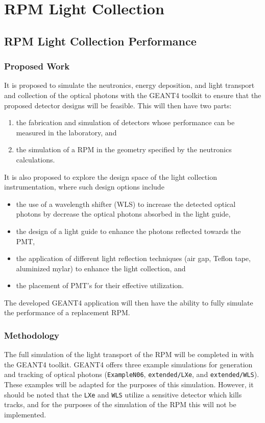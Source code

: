 

\chapter{RPM Light Collection}
\label{chap:LightTransport}
\section{RPM Light Collection Performance}
\label{sec:RPMLCP}



\subsection{Proposed Work}
It is proposed to simulate the neutronics, energy deposition, and light transport and collection of the optical photons with the GEANT4 toolkit to ensure that the proposed detector designs will be feasible. 
This will then have two parts:
\begin{enumerate}
  \item the fabrication and simulation of detectors whose performance can be measured in the laboratory, and
  \item the simulation of a RPM in the geometry specified by the neutronics calculations.
\end{enumerate}
It is also proposed to explore the design space of the light collection instrumentation, where such design options include
\begin{itemize}
  \item the use of a wavelength shifter (WLS) to increase the detected optical photons by decrease the optical photons absorbed in the light guide,
  \item the design of a light guide to enhance the photons reflected towards the PMT,
  \item the application of different light reflection techniques (air gap, Teflon tape, aluminized mylar) to enhance the light collection, and
  \item the placement of PMT's for their effective utilization.
\end{itemize}
The developed GEANT4 application will then have the ability to fully simulate the performance of a replacement RPM.

\subsection{Methodology}
The full simulation of the light transport of the RPM will be completed in with the GEANT4 toolkit.
GEANT4 offers three example simulations for generation and tracking of optical photons (\verb+ExampleN06+, \verb+extended/LXe+, and \verb+extended/WLS+).
These examples will be adapted for the purposes of this simulation.
However, it should be noted that the \verb+LXe+ and \verb+WLS+ utilize a sensitive detector which kills tracks, and for the purposes of the simulation of the RPM this will not be implemented.

